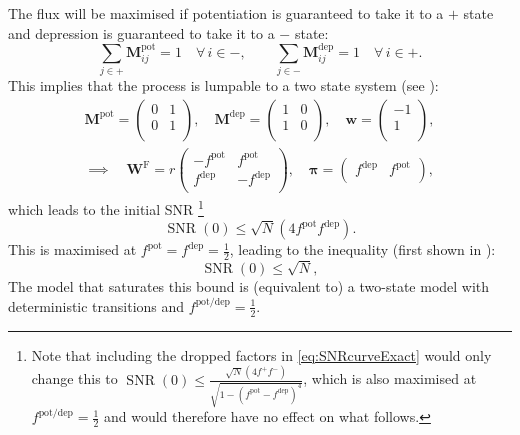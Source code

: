 \documentclass[12pt]{article}
\newcommand{\eqm}{\pi}
\newcommand{\eq}{\boldsymbol{\eqm}}
\newcommand{\wm}{w}
\newcommand{\w}{\mathbf{\wm}}
\newcommand{\Wm}{W}
\newcommand{\W}{\mathbf{\Wm}}
\newcommand{\MMdm}{M}
\newcommand{\MMd}{\mathbf{\MMdm}}
\newcommand{\frg}{\W^{\mathrm{F}}}
\newcommand{\pot}{^{\text{pot}}}
\newcommand{\dep}{^{\text{dep}}}
\newcommand{\potdep}{^{\text{pot/dep}}}
\DeclareMathOperator{\SNR}{SNR}
\DeclareMathOperator{\snr}{SNR}
\begin{document}
The flux will be maximised if potentiation is guaranteed to take it to a \(+\) state and depression is guaranteed to take it to a \(-\) state:
%
\begin{equation*}
  \sum_{j \in +} \MMd \pot_{ij} = 1 \quad \forall\, i \in -,
  \qquad
  \sum_{j \in -} \MMd \dep_{ij} = 1 \quad \forall\, i \in +.
\end{equation*}
%
This implies that the process is lumpable to a two state system (see \cite{kemeny1960finite,Ball1993Lumpability,burke1958markovian}):
%
\begin{multline}\label{eq:binarylump}
  \MMd \pot = \begin{pmatrix}
                0 & 1 \\
                0 & 1 \\
              \end{pmatrix}
  ,\quad
  \MMd \dep = \begin{pmatrix}
                1 & 0 \\
                1 & 0 \\
              \end{pmatrix}
  ,\quad
  \w = \begin{pmatrix}
           -1 \\
           1 \\
         \end{pmatrix}
  ,\\ \implies\quad
  \frg = r\begin{pmatrix}
            -f\pot & f\pot \\
            f\dep & -f\dep \\
          \end{pmatrix}
  ,\quad
  \eq = \begin{pmatrix}
           f\dep & f\pot \\
         \end{pmatrix}
  ,
\end{multline}
%
which leads to the initial SNR%
\footnote{Note that including the dropped factors in \cref{eq:SNRcurveExact} would only change this to
\(\SNR(0) \leq \frac{\sqrt{N} (4f^+f^-)}{\sqrt{1 - (f\pot - f\dep)^4}}\),
which is also maximised at \(f\potdep = \frac{1}{2}\) and would therefore have no effect on what follows.}
%
\begin{equation}\label{eq:binarySNR}
  \SNR(0) \leq \sqrt{N} (4 f\pot f\dep) .
\end{equation}
%
This is maximised at \(f\pot = f\dep = \frac{1}{2}\),
leading to the inequality (first shown in \cite{Lahiri2013synapse}):
%
\begin{equation}\label{eq:initbnd}
  \snr(0) \leq \sqrt{N},
\end{equation}
%
The model that saturates this bound is (equivalent to) a two-state model with deterministic transitions and \(f\potdep=\frac{1}{2}\).
\end{document}
